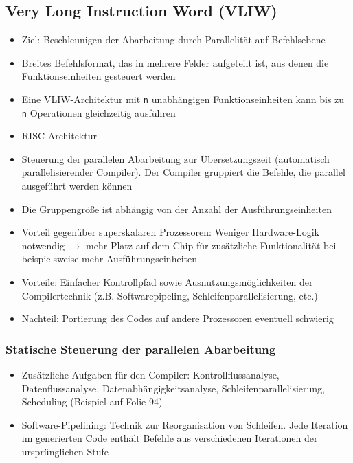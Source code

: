 \subsection{Very Long Instruction Word (VLIW)}
\begin{itemize}
	\item Ziel: Beschleunigen der Abarbeitung durch Parallelität auf Befehlsebene
	\item Breites Befehlsformat, das in mehrere Felder aufgeteilt ist, aus denen die Funktionseinheiten gesteuert werden
	\item Eine VLIW-Architektur mit \texttt{n} unabhängigen Funktionseinheiten kann bis zu \texttt{n} Operationen gleichzeitig ausführen
	\item RISC-Architektur
	\item Steuerung der parallelen Abarbeitung zur Übersetzungszeit (automatisch parallelisierender Compiler). Der Compiler gruppiert die Befehle, die parallel ausgeführt werden können
	\item Die Gruppengröße ist abhängig von der Anzahl der Ausführungseinheiten
	\item Vorteil gegenüber superskalaren Prozessoren: Weniger Hardware-Logik notwendig \(\rightarrow\) mehr Platz auf dem Chip für zusätzliche Funktionalität bei beispielsweise mehr Ausführungseinheiten
	\item Vorteile: Einfacher Kontrollpfad sowie Ausnutzungsmöglichkeiten der Compilertechnik (z.B. Softwarepipeling, Schleifenparallelisierung, etc.)
	\item Nachteil: Portierung des Codes auf andere Prozessoren eventuell schwierig
\end{itemize}

\subsubsection{Statische Steuerung der parallelen Abarbeitung}
\begin{itemize}
	\item Zusätzliche Aufgaben für den Compiler: Kontrollflussanalyse, Datenflussanalyse, Datenabhängigkeitsanalyse, Schleifenparallelisierung, Scheduling (Beispiel auf Folie 94)
	\item Software-Pipelining: Technik zur Reorganisation von Schleifen. Jede Iteration im generierten Code enthält Befehle aus verschiedenen Iterationen der ursprünglichen Stufe
\end{itemize}

